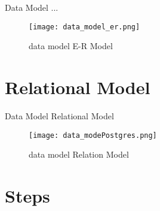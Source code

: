 \documentclass[10pt]{article}         %
\begin{document}
Data Model ...
\begin{figure}[b]
     \texttt{[image: data\_model\_er.png]}
     \caption{data model E-R Model}
\end{figure}

\section{Relational Model}
Data Model  Relational Model

 \begin{figure}[b]
     \texttt{[image: data\_modePostgres.png]}
     \caption{data model Relation Model}
\end{figure}

\section{Steps}
\end{document}
